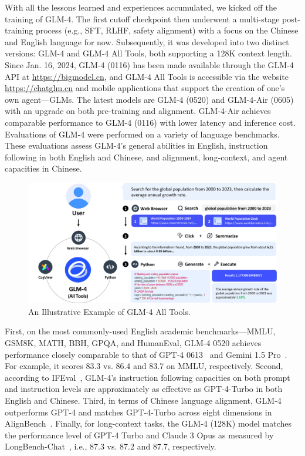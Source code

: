 With all the lessons learned and experiences accumulated, we kicked off the training of GLM-4. 
The first cutoff checkpoint then underwent a multi-stage post-training process (e.g., SFT, RLHF, safety alignment) with a focus on the Chinese and English language for now. 
Subsequently, it was developed into two distinct versions: GLM-4 and GLM-4 All Tools, both supporting a 128K context length. 
Since Jan. 16, 2024, GLM-4 (0116) has been made available through the GLM-4 API at \url{https://bigmodel.cn}, and GLM-4 All Tools is accessible via the website \url{https://chatglm.cn} and mobile applications that support the creation of one's own agent---GLMs. 
The latest models are GLM-4 (0520) and GLM-4-Air (0605) with an upgrade on both pre-training and alignment. 
GLM-4-Air achieves comparable performance to GLM-4 (0116) with lower latency and inference cost. 
Evaluations of GLM-4 were performed on a variety of language benchmarks. 
These evaluations assess GLM-4's general abilities in English, instruction following in both English and Chinese, and alignment, long-context, and agent capacities in Chinese.  

\begin{figure}[tb]
    \centering
    \includegraphics[width=\linewidth]{figs/alltools-example-2.pdf}
    \caption{An Illustrative Example of GLM-4 All Tools.
    }
    \label{fig:alltools-example}
\end{figure}

First, on the most commonly-used English academic benchmarks---MMLU, GSM8K, MATH, BBH, GPQA, and HumanEval, GLM-4 0520 achieves performance closely comparable to that of GPT-4 0613~\cite{openai2023gpt} and Gemini 1.5 Pro~\cite{geminiteam2023gemini}. 
For example, it scores 83.3 vs. 86.4 and 83.7 on MMLU, respectively. 
Second, according to IFEval~\cite{zhou2023instruction}, GLM-4's instruction following capacities on both prompt and instruction levels are approximately as effective as GPT-4-Turbo in both English and Chinese. 
Third, in terms of  Chinese language alignment, GLM-4 outperforms GPT-4 and matches GPT-4-Turbo across eight dimensions in AlignBench~\cite{liu2023alignbench}.   
Finally, for long-context tasks, the GLM-4 (128K) model matches the performance level of GPT-4 Turbo and Claude 3 Opus as measured by LongBench-Chat~\cite{bai2024longalign}, i.e., 87.3 vs. 87.2 and 87.7, respectively. 


